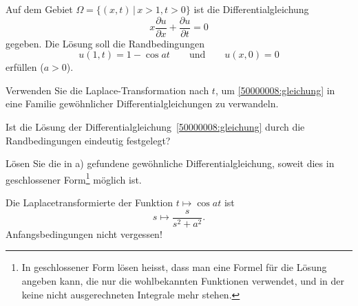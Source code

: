 Auf dem Gebiet $\Omega=\{(x,t)\,|\, x>1,t > 0\}$
ist die Differentialgleichung
\begin{equation}
x\frac{\partial u}{\partial x}+\frac{\partial u}{\partial t}=0
\label{50000008:gleichung}
\end{equation}
gegeben. Die Lösung soll die Randbedingungen
\[
u(1,t)=1-\cos at
\qquad
\text{und}
\qquad
u(x,0)=0
\]
erfüllen ($a > 0$).
\begin{teilaufgaben}
\item Verwenden Sie die Laplace-Transformation nach $t$,
um \eqref{50000008:gleichung} in eine Familie gewöhnlicher
Differentialgleichungen zu verwandeln.
\item 
Ist die Lösung der Differentialgleichung~\eqref{50000008:gleichung} durch
die Randbedingungen eindeutig festgelegt?
\item
Lösen Sie die in a) gefundene gewöhnliche Differentialgleichung,
soweit dies in geschlossener Form\footnote{In geschlossener Form
lösen heisst, dass man eine Formel für die Lösung angeben kann, die 
nur die wohlbekannten Funktionen verwendet, und in der keine nicht
ausgerechneten Integrale mehr stehen.
} möglich ist.
\end{teilaufgaben}

\begin{hinweis}
Die Laplacetransformierte der Funktion $t\mapsto\cos at$ ist
\[
s\mapsto
\frac{s}{s^2+a^2}.
\]
Anfangsbedingungen nicht vergessen!
\end{hinweis}

